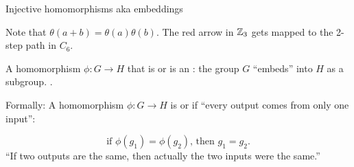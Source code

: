 \documentclass[8pt, handout]{beamer}
\newcommand{\Pause}{\pause}      %
\begin{document}
\begin{frame}{Injective homomorphisms aka embeddings}
  \Pause
  
  Note that $\theta(a+b)=\theta(a)\theta(b)$. The
  red arrow in $\mathbb{Z}_3$ gets mapped to the 2-step path in $C_6$. 
  
  \medskip\Pause
  
  A homomorphism $\phi\colon G\to H$ that is  or  is an : the group $G$ ``embeds'' into $H$ as a subgroup. .

  \begin{block}{Formally:}
    A homomorphism $\phi\colon G\to H$ is  or  if ``every output comes from only one input'':

    \[\text{if } \phi(g_1) = \phi(g_2)\text{, then }g_1 = g_2.\]\pause
    ``If two outputs are the same, then actually the two inputs were the same.''
  \end{block}
  
\end{frame}

\end{document}
